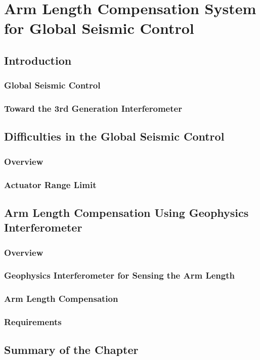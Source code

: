 \chapter{Arm Length Compensation System for Global Seismic Control}
\section{Introduction}
\subsection{Global Seismic Control}
\subsection{}
\subsection{Toward the 3rd Generation Interferometer}
\section{Difficulties in the Global Seismic Control}
\subsection{Overview}
\subsection{Actuator Range Limit}
\subsection{}
\section{Arm Length Compensation Using Geophysics Interferometer}
\subsection{Overview}
\subsection{Geophysics Interferometer for Sensing the Arm Length}
\subsection{Arm Length Compensation}
\subsection{Requirements}


\section{Summary of the Chapter}
